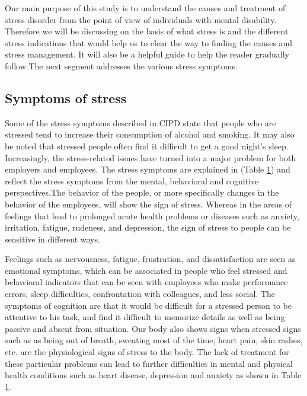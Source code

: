 Our main purpose of this study is to understand the causes and treatment of stress disorder from the point of view of individuals with mental disability. Therefore we will be discussing on the basis of what stress is and the different stress indications that would help us to clear the way to finding the causes and stress management.  It will also be a helpful guide to help the reader gradually follow The next segment addresses the various stress symptoms.

\subsection{Symptoms of stress}
Some of the stress symptoms described in \acs{CIPD} state that people who are stressed tend to increase their consumption of alcohol and smoking. It may also be noted that stressed people often find it difficult to get a good night's sleep.  Increasingly, the stress-related issues have turned into a major problem for both employers and employees. The stress symptoms are explained in (Table \ref{fig:symptom}) and reflect the stress symptoms from the mental, behavioral and cognitive perspectives.The behavior of the people, or more specifically changes in the behavior of the employees, will show the sign of stress. Whereas in the areas of feelings that lead to prolonged acute health problems or diseases such as anxiety, irritation, fatigue, rudeness, and depression, the sign of stress to people can be sensitive in different ways.

\begin{figure}[ht!]
\centering
{}
  \label{fig:symptom}
\end{figure}

Feelings such as nervousness, fatigue, frustration, and dissatisfaction are seen as emotional symptoms, which can be associated in people who feel stressed and behavioral indicators that can be seen with employees who make performance errors, sleep difficulties, confrontation with colleagues, and less social. 
The symptoms of cognition are that it would be difficult for a stressed person to be attentive to his task, and find it difficult to memorize details as well as being passive and absent from situation.
Our body also shows signs when stressed signs such as as being out of breath, sweating most of the time, heart pain, skin rashes, etc. are the physiological signs of stress to the body. The lack of treatment for these particular problems can lead to further difficulties in mental and physical health conditions such as heart disease, depression and anxiety as shown in Table \ref{fig:symptom}.

